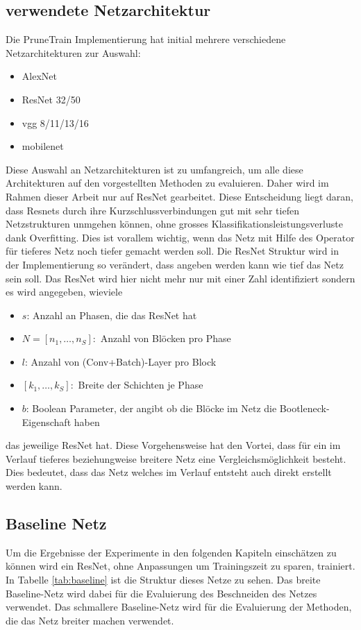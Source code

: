 \subsection{verwendete Netzarchitektur}\label{sec:archi}
Die PruneTrain Implementierung hat initial mehrere verschiedene Netzarchitekturen zur Auswahl:
\begin{itemize}
 \item AlexNet
 \item ResNet 32/50
 \item vgg 8/11/13/16
 \item mobilenet
\end{itemize}

Diese Auswahl an Netzarchitekturen ist zu umfangreich, um alle diese Architekturen auf den vorgestellten Methoden zu evaluieren. Daher wird im Rahmen dieser Arbeit nur auf ResNet gearbeitet. Diese Entscheidung liegt daran, dass Resnets durch ihre Kurzschlussverbindungen gut mit sehr tiefen Netzstrukturen unmgehen können, ohne grosses Klassifikationsleistungsverluste dank Overfitting. Dies ist vorallem wichtig, wenn das Netz mit Hilfe des Operator für tieferes Netz noch tiefer gemacht werden soll. Die ResNet Struktur wird in der Implementierung so verändert, dass angeben werden kann wie tief das Netz sein soll. Das ResNet wird hier nicht mehr nur mit einer Zahl identifiziert sondern es wird angegeben, wieviele
\begin{itemize}
 \item $s$: Anzahl an Phasen, die das ResNet hat
 \item $N=[n_1, \ldots, n_S]:$ Anzahl von Blöcken pro Phase 
 \item $l$: Anzahl von (Conv+Batch)-Layer pro Block
 \item $[k_1, \ldots,k_S ]:$ Breite der Schichten je Phase
 \item $b$: Boolean Parameter, der angibt ob die Blöcke im Netz die Bootleneck-Eigenschaft haben
\end{itemize}
das jeweilige ResNet hat. Diese Vorgehensweise hat den Vortei, dass für ein im Verlauf tieferes beziehungweise breitere Netz eine Vergleichsmöglichkeit besteht. Dies bedeutet, dass das Netz welches im Verlauf entsteht auch direkt erstellt werden kann.


\subsection{Baseline Netz}\label{sec:baseline}

Um die Ergebnisse der Experimente in den folgenden Kapiteln einschätzen zu können wird ein ResNet, ohne Anpassungen um Trainingszeit zu sparen, trainiert. In Tabelle \ref{tab:baseline} ist die Struktur dieses Netze zu sehen. Das breite Baseline-Netz wird dabei für die Evaluierung des Beschneiden des Netzes verwendet. Das schmallere Baseline-Netz wird für die Evaluierung der Methoden, die das Netz breiter machen verwendet.

